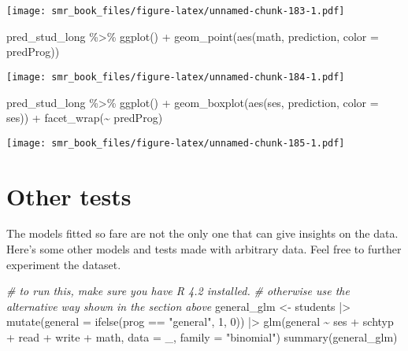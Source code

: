 \documentclass[
  oneside]{book}
\newenvironment{Shaded}{\begin{snugshade}}{\end{snugshade}}
\newcommand{\AttributeTok}[1]{\textcolor[rgb]{0.77,0.63,0.00}{#1}}
\newcommand{\CommentTok}[1]{\textcolor[rgb]{0.56,0.35,0.01}{\textit{#1}}}
\newcommand{\DecValTok}[1]{\textcolor[rgb]{0.00,0.00,0.81}{#1}}
\newcommand{\FunctionTok}[1]{\textcolor[rgb]{0.00,0.00,0.00}{#1}}
\newcommand{\NormalTok}[1]{#1}
\newcommand{\OtherTok}[1]{\textcolor[rgb]{0.56,0.35,0.01}{#1}}
\newcommand{\SpecialCharTok}[1]{\textcolor[rgb]{0.00,0.00,0.00}{#1}}
\newcommand{\StringTok}[1]{\textcolor[rgb]{0.31,0.60,0.02}{#1}}
\begin{document}
\texttt{[image: smr\_book\_files/figure-latex/unnamed-chunk-183-1.pdf]}

\begin{Shaded}
\begin{Highlighting}[]
\NormalTok{pred\_stud\_long }\SpecialCharTok{\%\textgreater{}\%}
  \FunctionTok{ggplot}\NormalTok{() }\SpecialCharTok{+}
  \FunctionTok{geom\_point}\NormalTok{(}\FunctionTok{aes}\NormalTok{(math, prediction, }\AttributeTok{color =}\NormalTok{ predProg))}
\end{Highlighting}
\end{Shaded}

\texttt{[image: smr\_book\_files/figure-latex/unnamed-chunk-184-1.pdf]}

\begin{Shaded}
\begin{Highlighting}[]
\NormalTok{pred\_stud\_long }\SpecialCharTok{\%\textgreater{}\%}
  \FunctionTok{ggplot}\NormalTok{() }\SpecialCharTok{+}
  \FunctionTok{geom\_boxplot}\NormalTok{(}\FunctionTok{aes}\NormalTok{(ses, prediction, }\AttributeTok{color =}\NormalTok{ ses)) }\SpecialCharTok{+}
  \FunctionTok{facet\_wrap}\NormalTok{(}\SpecialCharTok{\textasciitilde{}}\NormalTok{ predProg)}
\end{Highlighting}
\end{Shaded}

\texttt{[image: smr\_book\_files/figure-latex/unnamed-chunk-185-1.pdf]}

\hypertarget{other-tests}{%
\section{Other tests}\label{other-tests}}

The models fitted so fare are not the only one that can give
insights on the data. Here's some other models and tests made with
arbitrary data.
Feel free to further experiment the dataset.

\begin{Shaded}
\begin{Highlighting}[]
\CommentTok{\# to run this, make sure you have R 4.2 installed.}
\CommentTok{\# otherwise use the alternative way shown in the section above}
\NormalTok{general\_glm }\OtherTok{\textless{}{-}}\NormalTok{ students }\SpecialCharTok{|\textgreater{}} 
  \FunctionTok{mutate}\NormalTok{(}\AttributeTok{general =} \FunctionTok{ifelse}\NormalTok{(prog }\SpecialCharTok{==} \StringTok{"general"}\NormalTok{, }\DecValTok{1}\NormalTok{, }\DecValTok{0}\NormalTok{)) }\SpecialCharTok{|\textgreater{}}
  \FunctionTok{glm}\NormalTok{(general }\SpecialCharTok{\textasciitilde{}}\NormalTok{ ses }\SpecialCharTok{+}\NormalTok{ schtyp }\SpecialCharTok{+}\NormalTok{ read }\SpecialCharTok{+}\NormalTok{ write }\SpecialCharTok{+}\NormalTok{ math,}
    \AttributeTok{data =}\NormalTok{ \_, }\AttributeTok{family =} \StringTok{"binomial"}\NormalTok{)}
\FunctionTok{summary}\NormalTok{(general\_glm)}
\end{Highlighting}
\end{Shaded}
\end{document}
